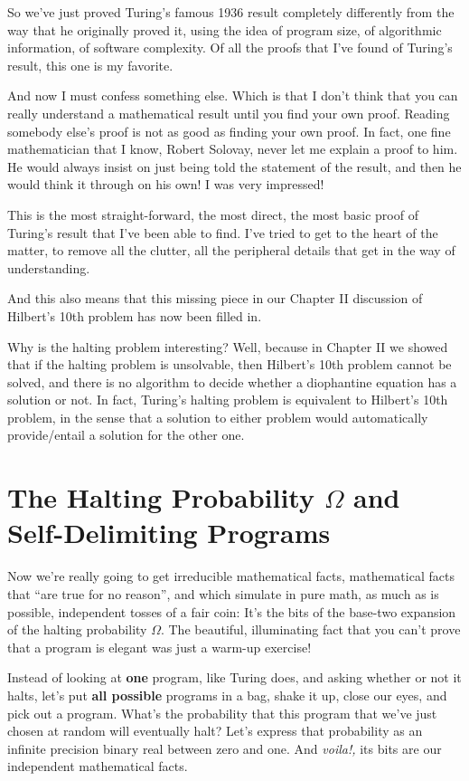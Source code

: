 \documentclass[12pt]{book}
\begin{document}
So we've just proved Turing's famous 1936 result completely differently from the way that
he originally proved it, 
using the idea of program size, of algorithmic information, of software complexity.
Of all the proofs that I've found of Turing's result, this one is my favorite.
 
And now I must confess something else.  Which is that I don't think that you can
really understand a mathematical result until you find your own proof.
Reading somebody else's proof is not as good as finding your own proof.
In fact, one fine mathematician that I know, Robert Solovay, never let me explain
a proof to him.  He would always insist on just being told the statement of the result,
and then he would think it through on his own!  I was very impressed!
 
This is the most straight-forward, the most direct, the most basic proof of Turing's
result that I've been able to find.
I've tried to get to the heart of the matter, to remove all the clutter, all the
peripheral details that get in the way of understanding.
 
And this also means that this missing piece in our Chapter II discussion of Hilbert's 10th problem
has now been filled in.
 
Why is the halting problem interesting?  
Well, because in Chapter II we showed that if the halting problem is unsolvable,
then Hilbert's 10th problem cannot be solved, and there is no algorithm to
decide whether a diophantine equation has a solution or not.
In fact, Turing's halting problem is equivalent to Hilbert's 10th problem, in the sense
that a solution to either problem would automatically provide/entail a solution for the other one.

\section*{The Halting Probability $\Omega$ and Self-Delimiting Programs}

Now we're really going to get irreducible mathematical facts, mathematical facts that
``are true for no reason'', and which simulate in pure math, as much as is possible, independent
tosses of a fair coin: It's
the bits of the base-two expansion of the halting probability
$\Omega$. The beautiful, illuminating
fact that you can't prove that a program is elegant was just a warm-up
exercise!
 
Instead of looking at \textbf{one} program, like Turing does, and asking whether
or not it halts, let's put \textbf{all possible} programs in a bag, shake it up,
close our eyes, and pick out a program.
What's the probability that this program that we've just chosen at random will eventually halt?
Let's express that probability as an infinite precision binary real between zero and one.
And \emph{voila!,} its bits are our independent mathematical facts.
 
\end{document}
